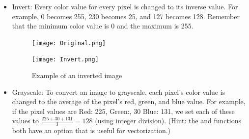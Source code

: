 \begin{itemize}
\item Invert:
Every color value for every pixel is changed to its inverse value. For example, 0 becomes 255, 230 becomes 25, and 127 becomes 128.
Remember that the minimum color value is 0 and the maximum is 255.

\vfill
\begin{figure}[ht]
\begin{minipage}[b]{0.47\linewidth}
\centering
\texttt{[image: Original.png]}
\end{minipage}
\hspace{0.1cm}
\begin{minipage}[b]{0.47\linewidth}
\centering
\texttt{[image: Invert.png]}
\end{minipage}
\caption{Example of an inverted image}
\end{figure}
\vfill

\item Grayscale:
To convert an image to grayscale, each pixel's color value is changed to the average of
the pixel's red, green, and blue value. For example, if the pixel values are
Red: 225, Green:, 30 Blue: 131, we set each of these values to $\frac{225 + 30 + 131}{3} = 128$ (using integer division). (Hint: the  and  
functions both have an  option that is useful for vectorization.)


\end{itemize}

